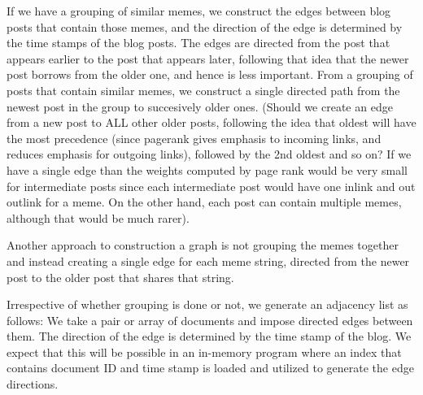 \documentclass{acm_proc_article-sp}
\begin{document}
If we have a grouping of similar memes, we construct the edges between blog posts that contain those memes, and the direction of the edge is determined by the time stamps of the blog posts. The edges are directed from the post that appears earlier to the post that appears later, following that idea that the newer post borrows from the older one, and hence is less important. From a grouping of posts that contain similar memes, we construct a single directed path from the newest post in the group to succesively older ones. (Should we create an edge from a new post to ALL other older posts, following the idea that oldest will have the most precedence (since pagerank gives emphasis to incoming links, and reduces emphasis for outgoing links), followed by the 2nd oldest and so on? If we have a single edge than the weights computed by page rank would be very small for intermediate posts since each intermediate post would have one inlink and out outlink for a meme. On the other hand, each post can contain multiple memes, although that would be much rarer).

Another approach to construction a graph is not grouping the memes together and instead creating a single edge for each meme string, directed from the newer post to the older post that shares that string.

Irrespective of whether grouping is done or not, we generate an adjacency list as follows: We take a pair or array of documents and impose directed edges between them. The direction of the edge is determined by the time stamp of the blog. We expect that this will be possible in an in-memory program where an index that contains document ID and time stamp is loaded and utilized to generate the edge directions. 
 



%

%
%
\end{document}
